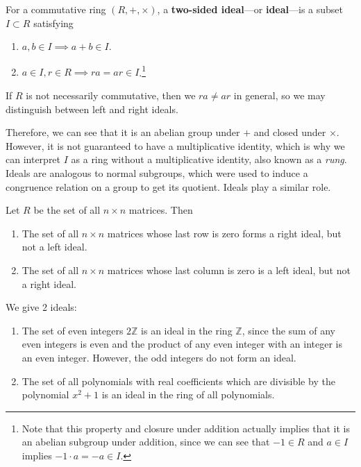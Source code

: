   \begin{definition}[Ideals]
    For a commutative ring $(R,+, \times)$, a \textbf{two-sided ideal}---or \textbf{ideal}---is a subset $I \subset R$ satisfying 
    \begin{enumerate}
      \item $a, b \in I \implies a + b \in I$. 
      \item $a \in I, r \in R \implies ra = ar \in I$.\footnote{Note that this property and closure under addition actually implies that it is an abelian subgroup under addition, since we can see that $-1 \in R$ and $a \in I$ implies $-1 \cdot a = -a \in I$.}
    \end{enumerate}
    If $R$ is not necessarily commutative, then we $ra \neq ar$ in general, so we may distinguish between left and right ideals. 
  \end{definition}

  Therefore, we can see that it is an abelian group under $+$ and closed under $\times$. However, it is not guaranteed to have a multiplicative identity, which is why we can interpret $I$ as a ring without a multiplicative identity, also known as a \textit{rung}. Ideals are analogous to normal subgroups, which were used to induce a congruence relation on a group to get its quotient. Ideals play a similar role. 

  \begin{example}
    Let $R$ be the set of all $n \times n$ matrices. Then 
    \begin{enumerate}
      \item The set of all $n \times n$ matrices whose last row is zero forms a right ideal, but not a left ideal.
      \item The set of all $n\times n$ matrices whose last column is zero is a left ideal, but not a right ideal. 
    \end{enumerate}
  \end{example}

  \begin{example}
    We give 2 ideals: 
    \begin{enumerate}
      \item The set of even integers $2 \mathbb{Z}$ is an ideal in the ring $\mathbb{Z}$, since the sum of any even integers is even and the product of any even integer with an integer is an even integer. However, the odd integers do not form an ideal. 
      \item The set of all polynomials with real coefficients which are divisible by the polynomial $x^2 + 1$ is an ideal in the ring of all polynomials. 
    \end{enumerate}
  \end{example}

